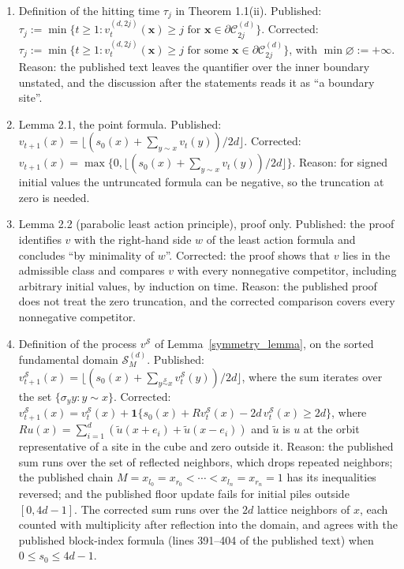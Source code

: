 \documentclass[12pt]{amsart}
\begin{document}
\begin{enumerate}
\item[C01.] Definition of the hitting time $\tau_j$ in Theorem 1.1(ii). Published: $\tau_{j} := \min\{ t \geq 1: v_t^{(d,2 j)}(\mathbf{x}) \geq j \text{ for } \mathbf{x} \in \partial \mathcal{C}^{(d)}_{2 j} \}$. Corrected: $\tau_{j} := \min\{ t \geq 1: v_t^{(d,2 j)}(\mathbf{x}) \geq j \text{ for some } \mathbf{x} \in \partial \mathcal{C}^{(d)}_{2 j} \}$, with $\min \varnothing := +\infty$. Reason: the published text leaves the quantifier over the inner boundary unstated, and the discussion after the statements reads it as ``a boundary site''.
\item[C02.] Lemma 2.1, the point formula. Published: $v_{t+1}(x) = \lfloor (s_0(x) + \sum_{y \sim x} v_t(y))/2d \rfloor$. Corrected: $v_{t+1}(x) = \max\{0, \lfloor (s_0(x) + \sum_{y \sim x} v_t(y))/2d \rfloor\}$. Reason: for signed initial values the untruncated formula can be negative, so the truncation at zero is needed.
\item[C03.] Lemma 2.2 (parabolic least action principle), proof only. Published: the proof identifies $v$ with the right-hand side $w$ of the least action formula and concludes ``by minimality of $w$''. Corrected: the proof shows that $v$ lies in the admissible class and compares $v$ with every nonnegative competitor, including arbitrary initial values, by induction on time. Reason: the published proof does not treat the zero truncation, and the corrected comparison covers every nonnegative competitor.
\item[C04.] Definition of the process $v^{\mathcal S}$ of Lemma~\ref{symmetry_lemma}, on the sorted fundamental domain $\mathcal S^{(d)}_M$. Published: $v_{t+1}^{\mathcal S}(x) = \lfloor (s_0(x) + \sum_{y \overset{\mathcal S}{\sim} x} v_t^{\mathcal S}(y))/2d \rfloor$, where the sum iterates over the set $\{\sigma_y y : y \sim x\}$. Corrected: $v_{t+1}^{\mathcal S}(x) = v_t^{\mathcal S}(x) + \mathbf{1}\{ s_0(x) + R v_t^{\mathcal S}(x) - 2d\, v_t^{\mathcal S}(x) \geq 2d \}$, where $R u(x) = \sum_{i=1}^d \left( \widetilde u(x + e_i) + \widetilde u(x - e_i) \right)$ and $\widetilde u$ is $u$ at the orbit representative of a site in the cube and zero outside it. Reason: the published sum runs over the set of reflected neighbors, which drops repeated neighbors; the published chain $M = x_{l_0} = x_{r_0} < \cdots < x_{l_n} = x_{r_n} = 1$ has its inequalities reversed; and the published floor update fails for initial piles outside $[0, 4d-1]$. The corrected sum runs over the $2d$ lattice neighbors of $x$, each counted with multiplicity after reflection into the domain, and agrees with the published block-index formula (lines 391--404 of the published text) when $0 \leq s_0 \leq 4d-1$.

\end{enumerate}
\end{document}
